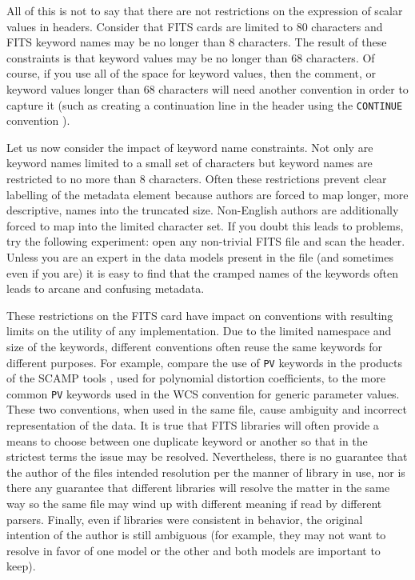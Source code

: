 \documentclass[final,authoryear,5p,times,twocolumn]{elsarticle}
\begin{document}
{{All of this is not to say that there are not restrictions on the expression
of scalar values in headers. Consider that FITS cards are limited to 80
characters and FITS keyword names may be no longer than 8 characters. The
result of these constraints is that keyword values may be no longer than
68 characters. Of course, if you use all of the space for keyword values,
then the comment, or keyword values longer than 68 characters will need
another convention in order to capture it (such as creating a continuation
line in the header using the \texttt{CONTINUE} convention \citep{2007Continue}).


Let us now consider the impact of keyword name constraints. Not only
are keyword names limited to a small set of characters but keyword
names are restricted to no more than 8 characters. Often these
restrictions prevent clear labelling of the metadata element because
authors are forced to map longer, more descriptive, names into the
truncated size. Non-English authors are additionally forced to map
into the limited character set. If you doubt this leads to problems,
try the following experiment: open any non-trivial FITS file and scan
the header. Unless you are an expert in the data models present in the
file (and sometimes even if you are) it is easy to find that the
cramped names of the keywords often leads to arcane and confusing
metadata.


These restrictions on the FITS card have impact on conventions with
resulting limits on the utility of any implementation. Due to the limited
namespace and size of the keywords, different conventions often reuse
the same keywords for different purposes.  For example, compare the use
of \texttt{PV} keywords in the products of the SCAMP tools
\citep{2006ASPC..351..112B}, used for polynomial distortion coefficients,
to the more common \texttt{PV} keywords used in the WCS convention for generic
parameter values. 
These two conventions, when used in the same file, cause ambiguity and
incorrect representation of the data. It is true that FITS libraries
will often provide a means to choose between one duplicate keyword or another
so that in the strictest terms the issue may be resolved.
Nevertheless, there is no guarantee that the author of
the files intended resolution per the manner of library in use, nor is there any
guarantee that different libraries will resolve the matter in the same way
so the same file may wind up with different meaning if read by different parsers.
Finally, even if libraries were consistent in behavior, the original intention
of the author is still ambiguous (for example, they may not want to resolve
in favor of one model or the other and both models are important to keep).


}}
\end{document}
